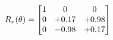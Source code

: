 \documentclass[preview]{standalone}
\begin{document}
\begin{align*}
\special{dvisvgm:raw <g id='unique000'>}R_{x}(\theta) = \begin{bmatrix}1 & 0 & 0 \\0 & +0.17 & +0.98 \\0 & -0.98 & +0.17\end{bmatrix}\special{dvisvgm:raw </g>}
\end{align*}
\end{document}
